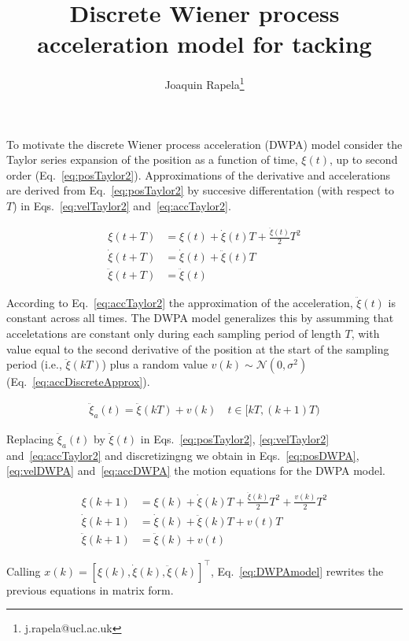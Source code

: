 \documentclass{article}
\title{Discrete Wiener process acceleration model for tacking}
\author{Joaquin Rapela\thanks{j.rapela@ucl.ac.uk}}
\begin{document}
\maketitle

To motivate the discrete Wiener process acceleration (DWPA) model consider the
Taylor series expansion of the position as a function of time, $\xi(t)$, up to
second order (Eq.~\ref{eq:posTaylor2}). Approximations of the derivative and
accelerations are derived from Eq.~\ref{eq:posTaylor2} by succesive
differentation (with respect to $T$) in Eqs.~\ref{eq:velTaylor2}
and~\ref{eq:accTaylor2}.

\begin{align}
    \xi(t+T)&=\xi(t)+\dot{\xi}(t)T+\frac{\ddot{\xi}(t)}{2}T^2\label{eq:posTaylor2}\\
    \dot{\xi}(t+T)&=\dot{\xi}(t)+\ddot{\xi}(t)T\label{eq:velTaylor2}\\
    \ddot{\xi}(t+T)&=\ddot{\xi}(t)\label{eq:accTaylor2}
\end{align}

According to Eq.~\ref{eq:accTaylor2} the approximation of the acceleration,
$\ddot{\xi}(t)$ is constant across all times. The DWPA model generalizes this
by assumming that acceletations are constant only during each sampling period
of length $T$, with value equal to the second derivative of the position at the
start of the sampling period (i.e., $\ddot{\xi}(kT)$) plus a random value
$v(k)\sim\mathcal{N}(0,\sigma^2)$ (Eq.~\ref{eq:accDiscreteApprox}).

\begin{align}
    \ddot{\xi}_a(t)=\ddot{\xi}(kT)+v(k)\quad t\in[kT,(k+1)T)\label{eq:accDiscreteApprox}
\end{align}

Replacing $\ddot{\xi}_a(t)$ by $\ddot{\xi}(t)$ in Eqs.~\ref{eq:posTaylor2},
\ref{eq:velTaylor2} and~\ref{eq:accTaylor2} and discretizingng we obtain in
Eqs.~\ref{eq:posDWPA}, \ref{eq:velDWPA} and~\ref{eq:accDWPA} the motion
equations for the DWPA model.

\begin{align}
    \xi(k+1)&=\xi(k)+\dot{\xi}(k)T+\frac{\ddot{\xi}(k)}{2}T^2+\frac{v(k)}{2}T^2\label{eq:posDWPA}\\
    \dot{\xi}(k+1)&=\dot{\xi}(k)+\ddot{\xi}(k)T+v(t)T\label{eq:velDWPA}\\
    \ddot{\xi}(k+1)&=\ddot{\xi}(k)+v(t)\label{eq:accDWPA}
\end{align}

Calling $x(k)=[\xi(k), \dot{\xi}(k), \ddot{\xi}(k)]^\intercal$,
Eq.~\ref{eq:DWPAmodel} rewrites the previous
equations in matrix form.
\end{document}
